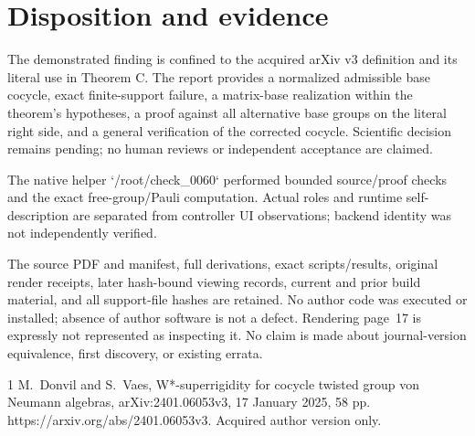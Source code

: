 \documentclass[10pt]{article}
\begin{document}
\section*{Disposition and evidence}
The demonstrated finding is confined to the acquired arXiv v3 definition and its literal use in Theorem C. The report provides a normalized admissible base cocycle, exact finite-support failure, a matrix-base realization within the theorem’s hypotheses, a proof against all alternative base groups on the literal right side, and a general verification of the corrected cocycle. Scientific decision remains pending; no human reviews or independent acceptance are claimed.\par
The native helper `/root/check\_0060` performed bounded source/proof checks and the exact free-group/Pauli computation. Actual roles and runtime self-description are separated from controller UI observations; backend identity was not independently verified.\par
The source PDF and manifest, full derivations, exact scripts/results, original render receipts, later hash-bound viewing records, current and prior build material, and all support-file hashes are retained. No author code was executed or installed; absence of author software is not a defect. Rendering page 17 is expressly not represented as inspecting it. No claim is made about journal-version equivalence, first discovery, or existing errata.\par
1 M. Donvil and S. Vaes, W*-superrigidity for cocycle twisted group von Neumann algebras, arXiv:2401.06053v3, 17 January 2025, 58 pp. https://arxiv.org/abs/2401.06053v3. Acquired author version only.\par
\end{document}
